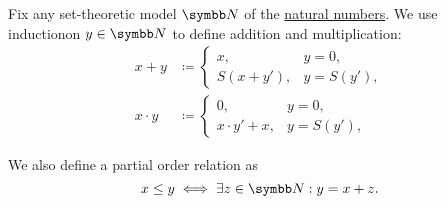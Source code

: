 \begin{definition}\label{def:natural_number_operations}
  Fix any set-theoretic model \( \BN \) of the \hyperref[def:natural_numbers]{natural numbers}. We use induction\IND on \( y \in \BN \) to define addition and multiplication:
  \begin{align*}
    x + y     & \coloneqq \begin{cases}
      x,         & y = 0,     \\
      S(x + y'), & y = S(y'),
    \end{cases}
    \\
    x \cdot y & \coloneqq \begin{cases}
      0,              & y = 0,     \\
      x \cdot y' + x, & y = S(y'),
    \end{cases}
  \end{align*}

  We also define a partial order relation as
  \begin{equation*}
    x \leq y \iff \exists z \in \BN: y = x + z.
  \end{equation*}
\end{definition}

